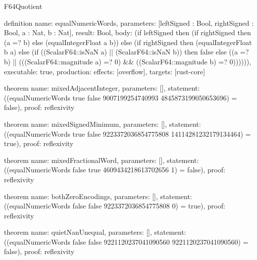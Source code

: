 \begin{lexlean}{F64Quotient}
\begin{semanticmodule}
definition{
  name: equalNumericWords,
  parameters: [leftSigned : Bool, rightSigned : Bool, a : Nat, b : Nat],
  result: Bool,
  body: (if leftSigned then (if rightSigned then (a =? b) else (equalIntegerFloat a b))
    else (if rightSigned then (equalIntegerFloat b a)
      else (if ((ScalarF64::isNaN a) || (ScalarF64::isNaN b)) then false
        else ((a =? b) || (((ScalarF64::magnitude a) =? 0) && ((ScalarF64::magnitude b) =? 0)))))),
  executable: true,
  production: {effects: [overflow], targets: [rust-core]}
}

theorem{
  name: mixedAdjacentInteger,
  parameters: [],
  statement: ((equalNumericWords true false 9007199254740993 4845873199050653696) = false),
  proof: reflexivity{}
}

theorem{
  name: mixedSignedMinimum,
  parameters: [],
  statement: ((equalNumericWords true false 9223372036854775808 14114281232179134464) = true),
  proof: reflexivity{}
}

theorem{
  name: mixedFractionalWord,
  parameters: [],
  statement: ((equalNumericWords false true 4609434218613702656 1) = false),
  proof: reflexivity{}
}

theorem{
  name: bothZeroEncodings,
  parameters: [],
  statement: ((equalNumericWords false false 9223372036854775808 0) = true),
  proof: reflexivity{}
}

theorem{
  name: quietNanUnequal,
  parameters: [],
  statement: ((equalNumericWords false false 9221120237041090560 9221120237041090560) = false),
  proof: reflexivity{}
}
\end{semanticmodule}
\end{lexlean}
